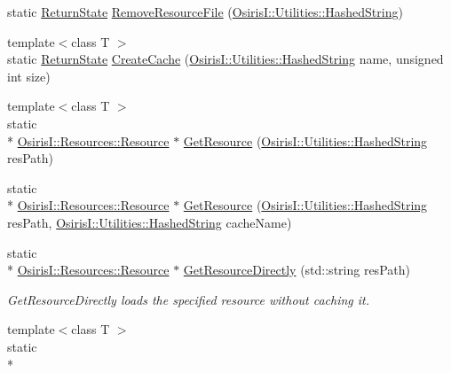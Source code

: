 \begin{DoxyCompactItemize}
\item 
static \hyperlink{namespace_osiris_i_a8f53bf938dc75c65c6a529694514013e}{Return\-State} \hyperlink{class_osiris_i_1_1_manager_1_1_resource_manager_af27e48836aefc06f300cc9ac8333845c}{Remove\-Resource\-File} (\hyperlink{class_osiris_i_1_1_utilities_1_1_hashed_string}{Osiris\-I\-::\-Utilities\-::\-Hashed\-String})
\item 
{\footnotesize template$<$class T $>$ }\\static \hyperlink{namespace_osiris_i_a8f53bf938dc75c65c6a529694514013e}{Return\-State} \hyperlink{class_osiris_i_1_1_manager_1_1_resource_manager_a32abf011b610c9b123bc3aa1475c4b46}{Create\-Cache} (\hyperlink{class_osiris_i_1_1_utilities_1_1_hashed_string}{Osiris\-I\-::\-Utilities\-::\-Hashed\-String} name, unsigned int size)
\item 
{\footnotesize template$<$class T $>$ }\\static \\*
\hyperlink{class_osiris_i_1_1_resources_1_1_resource}{Osiris\-I\-::\-Resources\-::\-Resource} $\ast$ \hyperlink{class_osiris_i_1_1_manager_1_1_resource_manager_aa304b5c8796f1077dd66b9359bd55e7d}{Get\-Resource} (\hyperlink{class_osiris_i_1_1_utilities_1_1_hashed_string}{Osiris\-I\-::\-Utilities\-::\-Hashed\-String} res\-Path)
\item 
static \\*
\hyperlink{class_osiris_i_1_1_resources_1_1_resource}{Osiris\-I\-::\-Resources\-::\-Resource} $\ast$ \hyperlink{class_osiris_i_1_1_manager_1_1_resource_manager_aa4bb81329757db9c66007feae99afbe6}{Get\-Resource} (\hyperlink{class_osiris_i_1_1_utilities_1_1_hashed_string}{Osiris\-I\-::\-Utilities\-::\-Hashed\-String} res\-Path, \hyperlink{class_osiris_i_1_1_utilities_1_1_hashed_string}{Osiris\-I\-::\-Utilities\-::\-Hashed\-String} cache\-Name)
\item 
static \\*
\hyperlink{class_osiris_i_1_1_resources_1_1_resource}{Osiris\-I\-::\-Resources\-::\-Resource} $\ast$ \hyperlink{class_osiris_i_1_1_manager_1_1_resource_manager_a07055371791526f942e6bdd837f62336}{Get\-Resource\-Directly} (std\-::string res\-Path)
\begin{DoxyCompactList}\small\item\em Get\-Resource\-Directly loads the specified resource without caching it. \end{DoxyCompactList}\item 
{\footnotesize template$<$class T $>$ }\\static \\*

\end{DoxyCompactItemize}
